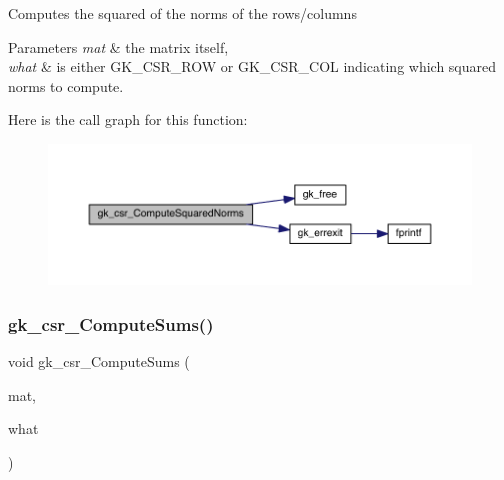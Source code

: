 Computes the squared of the norms of the rows/columns 
\begin{DoxyParams}{Parameters}
{\em mat} & the matrix itself, \\
\hline
{\em what} & is either G\+K\+\_\+\+C\+S\+R\+\_\+\+R\+OW or G\+K\+\_\+\+C\+S\+R\+\_\+\+C\+OL indicating which squared norms to compute. \\
\hline
\end{DoxyParams}
Here is the call graph for this function\+:\nopagebreak
\begin{figure}[H]
\begin{center}
\leavevmode
\includegraphics[width=350pt]{a00023_adb5c0f634607e45daaf7098399f1da0e_cgraph}
\end{center}
\end{figure}
\mbox{\label{a00023_a3cc2a64b0ead1b41ad824bc9401f1b84}} 
\subsubsection{\texorpdfstring{gk\+\_\+csr\+\_\+\+Compute\+Sums()}{gk\_csr\_ComputeSums()}}
{\footnotesize\ttfamily void gk\+\_\+csr\+\_\+\+Compute\+Sums (\begin{DoxyParamCaption}\item[{\hyperlink{a00634}{gk\+\_\+csr\+\_\+t} $\ast$}]{mat,  }\item[{int}]{what }\end{DoxyParamCaption})}

